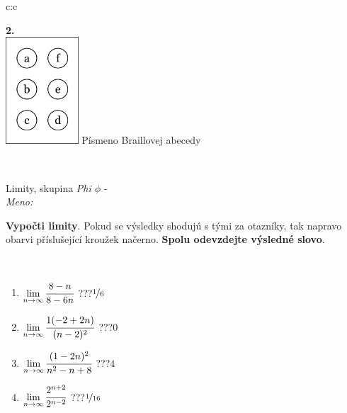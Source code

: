 \documentclass[10pt]{report}
\begin{document}
\begin{tabular}{c:c}
\begin{minipage}[c][104.5mm][t]{0.5\linewidth}
\begin{center}
\begin{minipage}{0.20\linewidth}
\begin{center}
{\Huge\bfseries 2.} \\[2mm]
\includegraphics[height=40mm]{../images/braille.png}
{\small Písmeno Braillovej abecedy}
\end{center}
\end{minipage}
\end{center}
\end{minipage}
\\ \hdashline
\begin{minipage}[c][104.5mm][t]{0.5\linewidth}
\begin{center}
\vspace{7mm}
{\huge Limity, skupina \textit{Phi $\phi$} -}\\[5mm]
\textit{Meno:}\phantom{xxxxxxxxxxxxxxxxxxxxxxxxxxxxxxxxxxxxxxxxxxxxxxxxxxxxxxxxxxxxxxxxx}\\[5mm]
\begin{minipage}{0.95\linewidth}
\begin{center}
\textbf{Vypočti limity}. Pokud se výsledky shodujú s tými za otazníky, tak napravo\\obarvi příslušející kroužek načerno. \textbf{Spolu odevzdejte výsledné slovo}.
\end{center}
\end{minipage}
\\[1mm]
\begin{minipage}{0.79\linewidth}
\begin{center}
\begin{varwidth}{\linewidth}
\begin{enumerate}
\normalsize
\item $\lim\limits_{n\to\infty}\cfrac{8-n}{8-6n}$\quad \dotfill\; ???\;\dotfill \quad $\nicefrac{1}{6}$
\item $\lim\limits_{n\to\infty}\cfrac{1(-2+2n)}{(n-2)^2}$\quad \dotfill\; ???\;\dotfill \quad $0$
\item $\lim\limits_{n\to\infty}\cfrac{(1-2n)^2}{n^2-n+8}$\quad \dotfill\; ???\;\dotfill \quad $4$
\item $\lim\limits_{n\to\infty}\cfrac{2^{n+2}}{2^{n-2}}$\quad \dotfill\; ???\;\dotfill \quad $\nicefrac{1}{16}$

\end{enumerate}
\end{varwidth}
\end{center}
\end{minipage}
\end{center}
\end{minipage}
\end{tabular}
\end{document}

